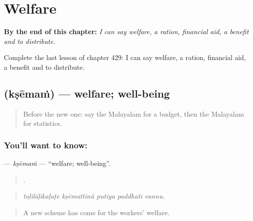
\chapter{Welfare}
\label{ch:ml-welfare}

\begin{chapteropening}
\textbf{By the end of this chapter:} \emph{I can say welfare, a ration, financial aid, a benefit and to distribute.}

Complete the last lesson of chapter 429: I can say welfare, a ration, financial aid, a benefit and to distribute.
\end{chapteropening}

\section[\texorpdfstring{\ml{ക്ഷേമം} (kṣēmaṁ)}{ക്ഷേമം (kṣēmaṁ)}]{ (kṣēmaṁ) — welfare; well-being}

\label{lesson:ML-C429-ksemam}



\begin{quote}
Before the new one: say the Malayalam for a budget, then the Malayalam for statistics.
\end{quote}

\subsection*{You'll want to know: }
\textbf{} — \emph{kṣēmaṁ} — \textquotedblleft{}welfare; well-being\textquotedblright{}.

\begin{quote}
    .
\end{quote}

\begin{quote}
\emph{toḻilāḷikaḷuṭe kṣēmattinŭ putiya paddhati vannu.}
\end{quote}

\begin{quote}
A new scheme has come for the workers' welfare.
\end{quote}

